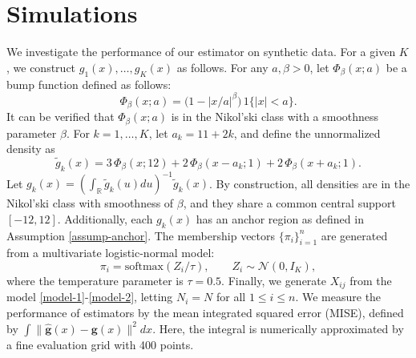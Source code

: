 \documentclass[preprint,11pt]{article}
\def\r#1{\textcolor{red}{\bf #1}}
\numberwithin{equation}{section}
\newcommand{\beq}{\begin{equation}}
\newcommand{\eeq}{\end{equation}}
\begin{document}
\section{Simulations} \label{sec:Simu}
We investigate the performance of our estimator on synthetic data. 
For a given $K$, we construct $g_1(x), \ldots, g_K(x)$ as follows. 
For any $a, \beta>0$, let $\Phi_{\beta}(x; a)$ be a bump function  %
defined as follows: 
\beq \label{bumps}
\Phi_{\beta}(x;a)
=
\bigl( 1 - |x/a|^{\beta}\bigr) \, 1\{ |x| < a\}. 
\eeq
It can be verified that $\Phi_{\beta}(x;a)$ is in the  Nikol’ski  class with a smoothness parameter $\beta$. 
For $k=1,\dots,K$, let $a_k = 11 + 2k$,
and define the unnormalized density as 
\beq \label{g-in-simu}
\tilde g_k(x)
=3\,\Phi_\beta(x;12)+
2\,\Phi_\beta(x-a_k;1)+
2\,\Phi_\beta(x+a_k;1).
\eeq
Let $
g_k(x) = \left(\int_{\mathbb{R}} \tilde g_k(u)du\right)^{-1}\tilde g_k(x)$. By construction, all densities are in the  Nikol’ski  class with smoothness of $\beta$, and they share a common central support $[-12,12]$. Additionally, each $g_k(x)$ has an anchor region as defined in Assumption \ref{assump-anchor}. The membership vectors $\{\pi_i\}_{i=1}^n$ are generated from a multivariate logistic-normal model: 
\[
\pi_i = \mathrm{softmax}(Z_i / \tau), \qquad Z_i \sim \mathcal{N}(0, I_K),
\] 
where the temperature parameter is $\tau=0.5$.  
Finally, we generate $X_{ij}$ from the model \eqref{model-1}-\eqref{model-2}, letting $N_i=N$ for all $1\leq i\leq n$. 
We measure the performance of estimators by the mean
integrated squared error (MISE), defined by $\int\|\widehat{\bm{g}}(x)-\bm{g}(x)\|^2dx$. Here, the integral is numerically approximated by a fine evaluation grid with 400 points.  
\end{document}
